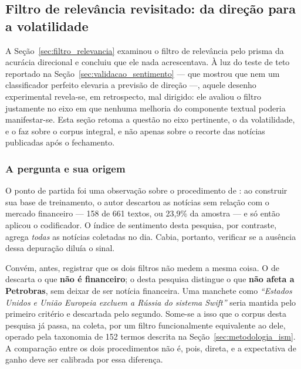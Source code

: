 \subsection{Filtro de relevância revisitado: da direção para a volatilidade}
\label{sec:relevancia_volatilidade}

A Seção~\ref{sec:filtro_relevancia} examinou o filtro de relevância pelo prisma da acurácia
direcional e concluiu que ele nada acrescentava. À luz do teste de teto reportado na
Seção~\ref{sec:validacao_sentimento} --- que mostrou que nem um classificador perfeito elevaria a
previsão de direção ---, aquele desenho experimental revela-se, em retrospecto, mal dirigido: ele
avaliou o filtro justamente no eixo em que nenhuma melhoria do componente textual poderia
manifestar-se. Esta seção retoma a questão no eixo pertinente, o da volatilidade, e o faz sobre o
corpus integral, e não apenas sobre o recorte das notícias publicadas após o fechamento.

\subsubsection{A pergunta e sua origem}

O ponto de partida foi uma observação sobre o procedimento de : ao
construir sua base de treinamento, o autor descartou as notícias sem relação com o mercado
financeiro --- 158 de 661 textos, ou 23,9\% da amostra --- e só então aplicou o codificador. O
índice de sentimento desta pesquisa, por contraste, agrega \emph{todas} as notícias coletadas no
dia. Cabia, portanto, verificar se a ausência dessa depuração diluía o sinal.

Convém, antes, registrar que os dois filtros não medem a mesma coisa. O de
 descarta o que \textbf{não é financeiro}; o desta pesquisa
distingue o que \textbf{não afeta a Petrobras}, sem deixar de ser notícia financeira. Uma manchete
como \emph{``Estados Unidos e União Europeia excluem a Rússia do sistema Swift''} seria mantida
pelo primeiro critério e descartada pelo segundo. Some-se a isso que o corpus desta pesquisa já
passa, na coleta, por um filtro funcionalmente equivalente ao dele, operado pela taxonomia de 152
termos descrita na Seção~\ref{sec:metodologia_ism}. A comparação entre os dois procedimentos não é,
pois, direta, e a expectativa de ganho deve ser calibrada por essa diferença.

